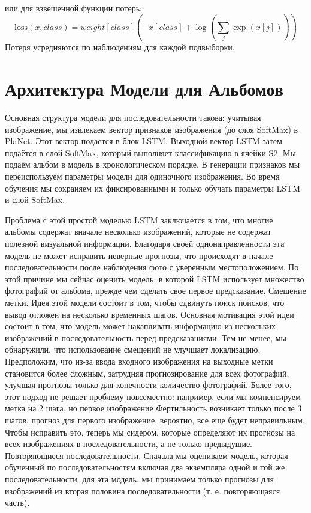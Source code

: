 или для взвешенной функции потерь:
$$ \text{loss}(x, class) = weight[class] \left(-x[class] + \log\left(\sum_j \exp(x[j])\right)\right) $$
Потеря усредняются по наблюдениям для каждой подвыборки.

\section{Архитектура Модели для Альбомов}
Основная структура модели для последовательности такова:
учитывая изображение, мы извлекаем вектор признаков изображения (до слоя SoftMax) в PlaNet. Этот вектор подается в блок LSTM. Выходной вектор LSTM затем подаётся в слой SoftMax, который выполняет классификацию в ячейки S2. Мы подаём альбом в модель в хронологическом порядке. В генерации признаков мы переиспользуем параметры модели для одиночного изображения. Во время обучения мы сохраняем их фиксированными и только обучать параметры LSTM и слой SoftMax.

Проблема с этой простой моделью LSTM заключается в том, что многие
альбомы содержат вначале несколько изображений, которые
не содержат полезной визуальной информации. Благодаря своей однонаправленности эта модель не может исправить неверные прогнозы, что
происходят в начале последовательности после наблюдения
фото с уверенным местоположением. По этой причине мы сейчас
оценить модель, в которой LSTM использует множество фотографий
от альбома, прежде чем сделать свое первое предсказание.
Смещение метки. Идея этой модели состоит в том, чтобы сдвинуть 
поиск поисков, что вывод отложен на несколько временных шагов. Основная мотивация этой идеи состоит в том, что модель может накапливать информацию из нескольких изображений в
последовательность перед предсказаниями. Тем не менее, мы
обнаружили, что использование смещений не улучшает локализацию. Предположим, что
из-за ввода входного изображения на выходные метки
становится более сложным, затрудняя прогнозирование
для всех фотографий, улучшая прогнозы только для конечности
количество фотографий. Более того, этот подход не
решает проблему повсеместно: например, если мы компенсируем
метка на 2 шага, но первое изображение Фертильность возникает только после 3 шагов, прогноз для первого
изображение, вероятно, все еще будет неправильным. Чтобы исправить это, теперь мы сидером, которые определяют их прогнозы на всех изображениях
в последовательности, а не только предыдущие. Повторяющиеся последовательности. Сначала мы оцениваем модель, которая
обученный по последовательностям
включая два экземпляра одной и той же последовательности. для эта модель, мы принимаем только прогнозы для изображений из вторая половина последовательности (т. е. повторяющаяся часть).

